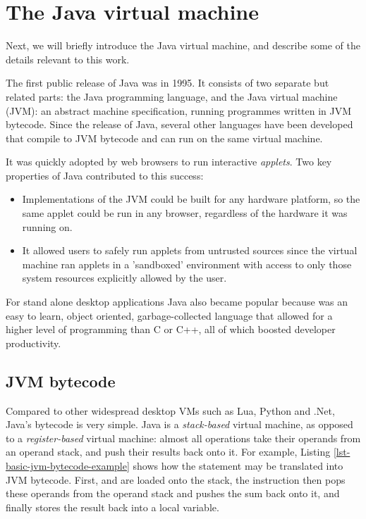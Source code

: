 \section{The Java virtual machine}
Next, we will briefly introduce the Java virtual machine, and describe some of the details relevant to this work.

The first public release of Java was in 1995. It consists of two separate but related parts: the Java programming language, and the Java virtual machine (JVM): an abstract machine specification, running programmes written in JVM bytecode. Since the release of Java, several other languages have been developed that compile to JVM bytecode and can run on the same virtual machine.

It was quickly adopted by web browsers to run interactive \emph{applets}. Two key properties of Java contributed to this success:
\begin{itemize}
    \item Implementations of the JVM could be built for any hardware platform, so the same applet could be run in any browser, regardless of the hardware it was running on.
    \item It allowed users to safely run applets from untrusted sources since the virtual machine ran applets in a 'sandboxed' environment with access to only those system resources explicitly allowed by the user.
\end{itemize}

For stand alone desktop applications Java also became popular because was an easy to learn, object oriented, garbage-collected language that allowed for a higher level of programming than C or C++, all of which boosted developer productivity.

\subsection{JVM bytecode}
Compared to other widespread desktop VMs such as Lua, Python and .Net, Java's bytecode is very simple. Java is a \emph{stack-based} virtual machine, as opposed to a \emph{register-based} virtual machine: almost all operations take their operands from an operand stack, and push their results back onto it. For example, Listing \ref{lst-basic-jvm-bytecode-example} shows how the statement  may be translated into JVM bytecode. First,  and  are loaded onto the stack, the  instruction then pops these operands from the operand stack and pushes the sum back onto it, and finally  stores the result back into a local variable.

